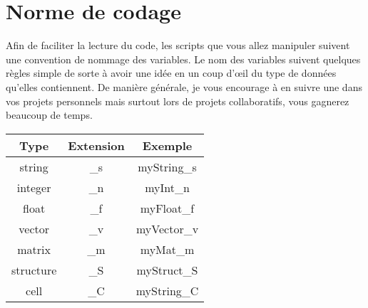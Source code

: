 \documentclass{article}
\begin{document}

\appendix
\section{Norme de codage}
Afin de faciliter la lecture du code, les scripts que vous allez manipuler suivent une convention de nommage des variables. Le nom des variables suivent quelques règles simple de sorte à avoir une idée en un coup d'\oe il du type de données qu'elles contiennent. De manière générale, je vous encourage à en suivre une dans vos projets personnels mais surtout lors de projets collaboratifs, vous gagnerez beaucoup de temps.

\begin{tabular}{c|c|c}
\hline
Type & Extension & Exemple \\
\hline
string & \_s & myString\_s \\
integer & \_n & myInt\_n \\
float & \_f & myFloat\_f \\
vector & \_v & myVector\_v \\
matrix & \_m & myMat\_m \\
structure & \_S & myStruct\_S \\
cell & \_C & myString\_C \\
\hline
\end{tabular}

\end{document}
